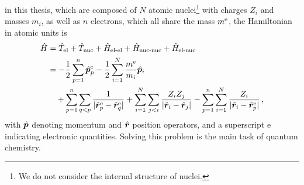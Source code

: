  in this thesis, which are composed of $N$ atomic nuclei\footnote[][-\baselineskip]{We do not consider the internal structure of nuclei.} with charges $Z_i$ and masses $m_i$, as well as $n$ electrons, which all share the mass $m^\text{e}$, the Hamiltonian in atomic units is
\begin{align}
	\hat H &= \hat T_{\text{el}} + \hat T_{\text{nuc}} + \hat H_{\text{el-el}} + \hat H_{\text{nuc-nuc}} + \hat H_{\text{el-nuc}}\\
	&= 
	- \frac{1}{2} \sum_{p=1}^n \hat{\boldsymbol{p}}^{\text{e}}_p
	- \frac{1}{2} \sum_{i=1}^N \frac{m^\text{e}}{m_i} \hat{\boldsymbol{p}}_i \\
	&\quad+ \sum_{p=1}^n \sum_{q<p} \frac{1}{|\hat{\boldsymbol{r}}^{\text{e}}_p - \hat{\boldsymbol{r}}^{\text{e}}_q|}
	+ \sum_{i=1}^N \sum_{j<i} \frac{Z_i Z_j}{|\hat{\boldsymbol{r}}_i - \hat{\boldsymbol{r}}_j|}
	- \sum_{p=1}^n \sum_{i=1}^N \frac{Z_i}{|\hat{\boldsymbol{r}}_i - \hat{\boldsymbol{r}}^{\text{e}}_p|}
	\, ,
\end{align}
with $\hat{\boldsymbol{p}}$ denoting momentum and $\hat{\boldsymbol{r}}$ position operators, and a superscript $\text{e}$ indicating electronic quantities. Solving this problem is the main task of quantum chemistry.

